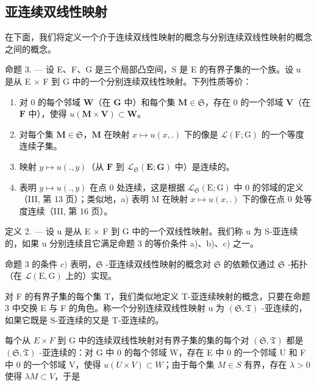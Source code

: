 \subsection{亚连续双线性映射}

在下面，我们将定义一个介于连续双线性映射的概念与分别连续双线性映射的概念之间的概念。

命题 3. --- 设 E、F、G 是三个局部凸空间，S 是 E 的有界子集的一个族。设 u 是从 E × F 到 G 中的一个分别连续双线性映射。下列性质等价：

\begin{enumerate}
\def\labelenumi{\alph{enumi})}
\item
  对 0 的每个邻域 \(\mathbf{W}\)（在 \(\mathbf{G}\) 中）和每个集 \(\mathbf{M} \in \mathfrak{S}\)，存在 0 的一个邻域 \(\mathbf{V}\)（在 \(\mathbf{F}\) 中），使得 \(u(\mathbf{M} \times \mathbf{V}) \subset \mathbf{W}\)。
\item
  对每个集 \(\mathbf{M} \in \mathfrak{S}\)，\(\mathbf{M}\) 在映射 \(x \mapsto u(x, .)\) 下的像是 \(\mathcal{L}(\mathrm{F}; \mathrm{G})\) 的一个等度连续子集。
\item
  映射 \(y \mapsto u(., y)\)（从 \(\mathbf{F}\) 到 \(\mathcal{L}_{\mathfrak{S}}(\mathbf{E}; \mathbf{G})\) 中）是连续的。
\item
  表明 \(y \mapsto u(., y)\) 在点 0 处连续，这是根据 \(\mathcal{L}_{\mathfrak{S}}(\mathrm{E}; \mathrm{G})\) 中 0 的邻域的定义（III, 第 13 页）；类似地，a) 表明 M 在映射 \(x \mapsto u(x, .)\) 下的像在点 0 处等度连续（III, 第 16 页）。
\end{enumerate}

定义 2. --- 设 u 是从 E × F 到 G 中的一个双线性映射。我们称 u 为 S-亚连续的，如果 u 分别连续且它满足命题 3 的等价条件 a)、b)、c) 之一。

命题 3 的条件 \(c)\) 表明，\(\mathfrak{S}\) -亚连续双线性映射的概念对 \(\mathfrak{S}\) 的依赖仅通过 \(\mathfrak{S}\) -拓扑（在 \(\mathcal{L}(\mathrm{E},\mathrm{G})\) 上的）实现。

对 F 的有界子集的每个集 T，我们类似地定义 T-亚连续映射的概念，只要在命题 3 中交换 E 与 F 的角色。称一个分别连续双线性映射 u 为 \((\mathfrak{S}, \mathfrak{T})\) -亚连续的，如果它既是 S-亚连续的又是 T-亚连续的。

每个从 \(E \times F\) 到 G 中的连续双线性映射对有界子集的集的每个对 \((\mathfrak{S}, \mathfrak{T})\) 都是 \((\mathfrak{S}, \mathfrak{T})\) -亚连续的：对 G 中 0 的每个邻域 W，存在 E 中 0 的一个邻域 U 和 F 中 0 的一个邻域 V，使得 \(u(U \times V) \subset W\)；由于每个集 \(M \in S\) 有界，存在 \(\lambda > 0\) 使得 \(\lambda M \subset V\)，于是

